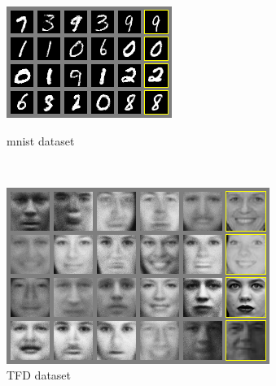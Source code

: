\documentclass[12pt]{article}
\begin{document}
\begin{multicols}{2}
\lipsum[1]
\end{multicols}


\begin{figure}
\centering
\begin{minipage}{.45\textwidth}
\includegraphics[width=\textwidth]{mnist1.png}
\caption{mnist dataset}
\end{minipage}
~~~~
\begin{minipage}{.45\textwidth}
\includegraphics[width=\textwidth]{tfd1.png}
\caption{TFD dataset}
\end{minipage}
\end{figure}
\end{document}
